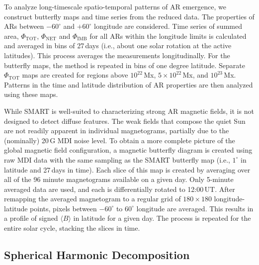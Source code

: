 \documentclass[namedreferences]{solarphysics}
\begin{document}
\begin{article}
To analyze long-timescale spatio-temporal patterns of AR emergence, we construct butterfly maps and time series from the reduced data. The properties of ARs between $-60^\circ$ and $+60^\circ$ longitude are considered. Time series of summed area, $\Phi_{\mathrm{TOT}}$, $\Phi_{\mathrm{NET}}$ and $\Phi_{\mathrm{IMB}}$ for all ARs within the longitude limits is calculated and averaged in bins of 27\,days (i.e., about one solar rotation at the active latitudes). This process averages the measurements longitudinally. 
For the butterfly maps, the method is repeated in bins of one degree latitude. Separate $\Phi_{\mathrm{TOT}}$ maps are created for regions above $10^{22}$\,Mx, $5\times10^{22}$\,Mx, and $10^{23}$\,Mx. Patterns in the time and latitude distribution of AR properties are then analyzed using these maps.


While SMART is well-suited to characterizing strong AR magnetic fields, it is not designed to detect diffuse features. The weak fields that compose the quiet Sun are not readily apparent in individual magnetograms, partially due to the (nominally) 20\,G MDI noise level. To obtain a more complete picture of the global magnetic field configuration, a magnetic butterfly diagram is created using raw MDI data with the same sampling as the SMART butterfly map (i.e., $1^\circ$ in latitude and 27\,days in time). Each slice of this map is created by averaging over all of the 96 minute magnetograms available on a given day. Only 5-minute averaged data are used, and each is differentially rotated to 12:00\,UT. After remapping the averaged magnetogram to a regular grid of $180\times180$ longitude-latitude points, pixels between $-60^{\circ}$ to $60^{\circ}$ longitude are averaged. This results in a profile of signed $\langle {B} \rangle$ in latitude for a given day. The process is repeated for the entire solar cycle, stacking the slices in time. 


\subsection{Spherical Harmonic Decomposition}\label{sub:sphharm}


\end{article}
\end{document}

